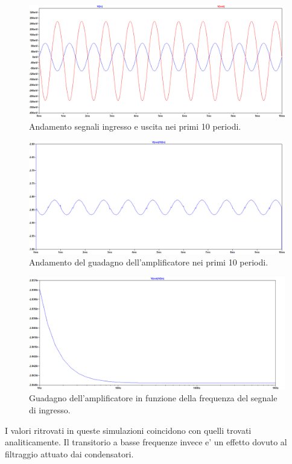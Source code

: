 \documentclass[a4paper,10pt]{article}
\begin{document}
\begin{figure}[h!]
  	\centering
 	\includegraphics[width=0.7\linewidth]{es2-3-3sign.png}
  	\caption{Andamento segnali ingresso e uscita nei primi 10 periodi.}
  	\label{fig:inout3}
\end{figure}
\begin{figure}[h!]
  	\centering
 	\includegraphics[width=0.7\linewidth]{es2-3-3gain.png}
  	\caption{Andamento del guadagno dell'amplificatore nei primi 10 periodi.}
  	\label{fig:gain10-3}
\end{figure}
\begin{figure}[h!]
  	\centering
 	\includegraphics[width=0.7\linewidth]{es2-3-3freq.png}
  	\caption{Guadagno dell'amplificatore in funzione della frequenza del segnale di ingresso.}
  	\label{fig:gainfreq-3}
\end{figure}
I valori ritrovati in queste simulazioni coincidono con quelli trovati analiticamente. Il transitorio a basse frequenze invece e' un effetto dovuto al filtraggio attuato dai condensatori.
\newpage
\end{document}
